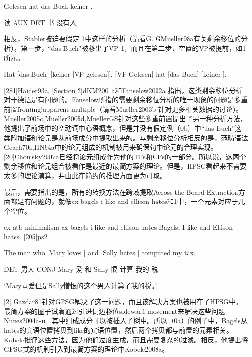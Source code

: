 Gelesen hat das Buch keiner  .

读 AUX DET 书 没有人



相反，Stabler被迫要假定 1中这样的分析（请看G. 
GMueller98a有关剩余移位的分析）。第一步，“das Buch”被移出了VP 1，而且在第二步，空置的VP被提前，如1所示。




Hat [das Buch] [keiner [VP  gelesen]].
[VP  Gelesen] hat [das Buch] [keiner ].

[281]Haider93a, 
[Section 2]dKM2001a和Fanselow2002a 指出，这类剩余移位分析对于德语是有问题的。Fanselow所指的需要剩余移位分析的唯一现象的问题是多重前置fronting!apparent multiple（请看Mueller2003b 针对更多相关数据的讨论）。Mueller2005c,Mueller2005d,MuellerGS针对这些多重前置提出了另一种分析方法，他提出了前场中的空动词中心语概念，但是并没有假定例（0b）中“das Buch”这类附加语和论元是从前场成分中提取出来的。与剩余移位分析相反的是，范畴语法Geach70a,HN94a中的论元组成的机制被用来确保句中论元的合理实现。[20]Chomsky2007a已经将论元组成作为他的TPs和CPs的一部分。所以说，这两个剩余移位和论元组合被看作是最近的最简方案的理论。但是，HPSG看起来不需要太多的理论演算，并由此在简约的推理方面更为可取。
















最后，需要指出的是，所有的转换方法在跨域提取Across the Board Extraction方面都是有问题的，就像ex-bagels-i-like-and-ellison-hates和1中，一个元素对应于几个空位。



ex-atb-minimalism
ex-bagels-i-like-and-ellison-hates
Bagels, I like and Ellison hates. 
  [205]ps2.


The man who [Mary loves ] and [Sally hates ] computed my tax.

DET 男人 CONJ Mary 爱  和 Sally 恨  计算 我的 税

`Mary喜爱但是Sally憎恨的这个男人计算了我的税。'

[2]
Gazdar81针对GPSG解决了这一问题，而且该解决方案也被用在了HPSG中。最简方案的圈子试着通过引进侧边移位sideward movement来解决这些问题Nunes2004a-u，其中组成成分可以被插入子树中。所以（0a）的例子中，Bagels从hates的宾语位置拷贝到like的宾语位置，然后两个拷贝都与前置的元素相关。Kobele批评这些方法，因为他们过度生成，而且需要复杂的过滤。相反，他提出将GPSG式的机制引入到最简方案的理论中Kobele2008a。








